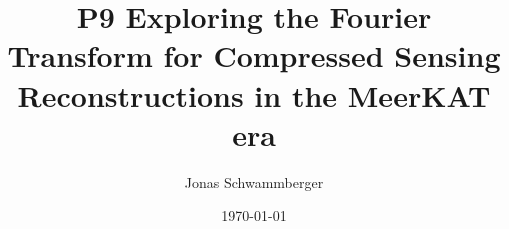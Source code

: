 \documentclass[11pt]{article}
\numberwithin{equation}{section}
\begin{document}
\title{P9 Exploring the Fourier Transform for Compressed Sensing Reconstructions in the MeerKAT era}
\author{Jonas Schwammberger}
\date{\today}
\begin{titlepage}
	\maketitle
	
	\thispagestyle{empty}
	\setcounter{page}{0}
\end{titlepage}


\newpage
\pagestyle{abstract}


\newpage
\pagestyle{tableofcontent}
\tableofcontents  	
\newpage

\pagestyle{documentstyle}
\setcounter{page}{1}


\newpage

\newpage

\newpage


\newpage
{}
%

\newpage
\listoffigures
\listoftables

\newpage

\newpage

\end{document}

